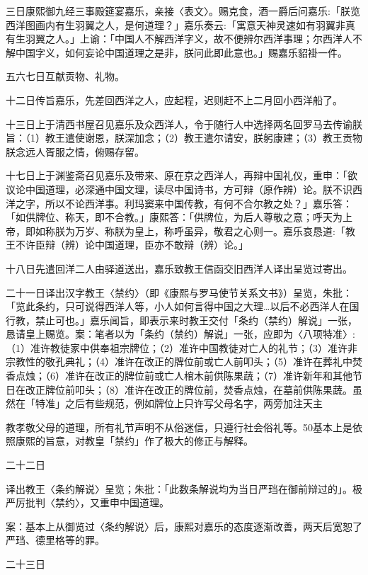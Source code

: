 三日康熙御九经三事殿筵宴嘉乐，亲接〈表文〉。赐克食，酒一爵后问嘉乐:「朕览西洋图画内有生羽翼之人，是何道理？」嘉乐奏云:「寓意天神灵速如有羽翼非真有生羽翼之人。」上谕：「中国人不解西洋字义，故不便辨尔西洋事理；尔西洋人不解中国字义，如何妄论中国道理之是非，朕问此即此意也。」赐嘉乐貂褂一件。

五六七日互献贡物、礼物。

十二日传旨嘉乐，先差回西洋之人，应起程，迟则赶不上二月回小西洋船了。


\noindent 十三日上于清西书屋召见嘉乐及众西洋人，令于随行人中选择两名回罗马去传谕朕旨：（1）教王遣使谢恩，朕深加念；（2）教王遣尔请安，朕躬康建；（3）教王贡物朕念远人胥服之情，俯赐存留。

十七日上于渊鉴斋召见嘉乐及带来、原在京之西洋人，再辩中国礼仪，重申：「欲议论中国道理，必深通中国文理，读尽中国诗书，方可辩（原作辨）论。朕不识西洋之字，所以不论西洋事。利玛窦来中国传教，有何不合尔教之处？」嘉乐答：「如供牌位、称天，即不合教。」康熙答：「供牌位，为后人尊敬之意；呼天为上帝，即如称朕为万岁、称朕为皇上，称呼虽异，敬君之心则一。嘉乐哀恳道:「教王不许臣辩（辨）论中国道理，臣亦不敢辩（辨）论。」

十八日先遣回洋二人由驿道送出，嘉乐致教王信函交旧西洋人译出呈览过寄出。

二十一日译出汉字教王〈禁约〉（即《康熙与罗马使节关系文书》）呈览，朱批：「览此条约，只可说得西洋人等，小人如何言得中国之大理…以后不必西洋人在国行教，禁止可也。」嘉乐闻旨，即表示来时教王交付「条约（禁约）解说」一张，恳请皇上赐览。案：笔者以为「条约（禁约）解说」一张，应即为〈八项特准〉:（1）准许教徒家中供奉祖宗牌位；（2）准许中国教徒对亡人的礼节；（3）准许非宗教性的敬孔典礼；（4）准许在改正的牌位前或亡人前叩头；（5）准许在葬礼中焚香点烛；（6）准许在改正的牌位前或亡人棺木前供陈果蔬；（7）准许新年和其他节日在改正牌位前叩头；（8）准许在改正的牌位前，焚香点烛，在墓前供陈果蔬。虽然在「特准」之后有些规范，例如牌位上只许写父母名字，两旁加注天主


教孝敬父母的道理，所有礼节声明不从俗迷信，只遵行社会俗礼等。50基本上是依照康熙的旨意，对教皇「禁约」作了极大的修正与解释。

二十二日

译出教王〈条约解说〉呈览；朱批：「此数条解说均为当日严珰在御前辩过的」。极严厉批判〈禁约〉，又重申中国道理。

案：基本上从御览过〈条约解说〉后，康熙对嘉乐的态度逐渐改善，两天后宽恕了严珰、德里格等的罪。

二十三日


